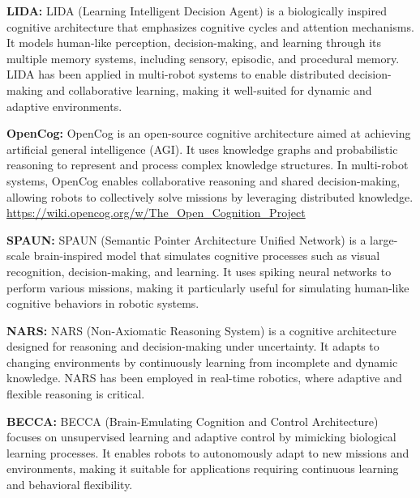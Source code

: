            \textbf{LIDA:} LIDA (Learning Intelligent Decision Agent) is a biologically inspired cognitive architecture that emphasizes cognitive cycles and attention mechanisms. It models human-like perception, decision-making, and learning through its multiple memory systems, including sensory, episodic, and procedural memory. LIDA has been applied in multi-robot systems to enable distributed decision-making and collaborative learning, making it well-suited for dynamic and adaptive environments. 

            \textbf{OpenCog:} OpenCog is an open-source cognitive architecture aimed at achieving artificial general intelligence (AGI). It uses knowledge graphs and probabilistic reasoning to represent and process complex knowledge structures. In multi-robot systems, OpenCog enables collaborative reasoning and shared decision-making, allowing robots to collectively solve missions by leveraging distributed knowledge. \url{https://wiki.opencog.org/w/The_Open_Cognition_Project}

            \textbf{SPAUN:} SPAUN (Semantic Pointer Architecture Unified Network) is a large-scale brain-inspired model that simulates cognitive processes such as visual recognition, decision-making, and learning. It uses spiking neural networks to perform various missions, making it particularly useful for simulating human-like cognitive behaviors in robotic systems.

            \textbf{NARS:} NARS (Non-Axiomatic Reasoning System) is a cognitive architecture designed for reasoning and decision-making under uncertainty. It adapts to changing environments by continuously learning from incomplete and dynamic knowledge. NARS has been employed in real-time robotics, where adaptive and flexible reasoning is critical. 

            \textbf{BECCA:} BECCA (Brain-Emulating Cognition and Control Architecture) focuses on unsupervised learning and adaptive control by mimicking biological learning processes. It enables robots to autonomously adapt to new missions and environments, making it suitable for applications requiring continuous learning and behavioral flexibility.

